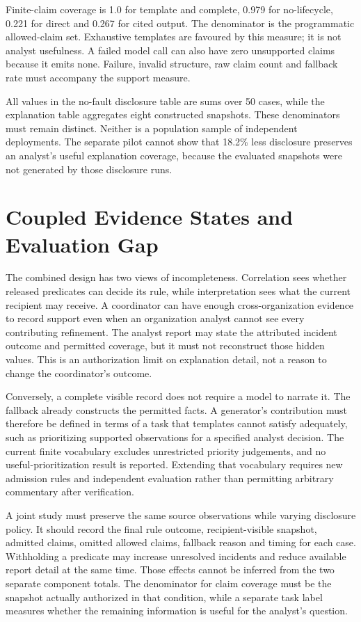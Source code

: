 \documentclass[conference,letterpaper]{IEEEtran}
\begin{document}
Finite-claim coverage is 1.0 for template and complete, 0.979 for no-lifecycle, 0.221 for direct and 0.267 for cited output. The denominator is the programmatic allowed-claim set. Exhaustive templates are favoured by this measure; it is not analyst usefulness. A failed model call can also have zero unsupported claims because it emits none. Failure, invalid structure, raw claim count and fallback rate must accompany the support measure.

All values in the no-fault disclosure table are sums over 50 cases, while the explanation table aggregates eight constructed snapshots. These denominators must remain distinct. Neither is a population sample of independent deployments. The separate pilot cannot show that 18.2\% less disclosure preserves an analyst's useful explanation coverage, because the evaluated snapshots were not generated by those disclosure runs.

\section{Coupled Evidence States and Evaluation Gap}
The combined design has two views of incompleteness. Correlation sees whether released predicates can decide its rule, while interpretation sees what the current recipient may receive. A coordinator can have enough cross-organization evidence to record support even when an organization analyst cannot see every contributing refinement. The analyst report may state the attributed incident outcome and permitted coverage, but it must not reconstruct those hidden values. This is an authorization limit on explanation detail, not a reason to change the coordinator's outcome.

Conversely, a complete visible record does not require a model to narrate it. The fallback already constructs the permitted facts. A generator's contribution must therefore be defined in terms of a task that templates cannot satisfy adequately, such as prioritizing supported observations for a specified analyst decision. The current finite vocabulary excludes unrestricted priority judgements, and no useful-prioritization result is reported. Extending that vocabulary requires new admission rules and independent evaluation rather than permitting arbitrary commentary after verification.

A joint study must preserve the same source observations while varying disclosure policy. It should record the final rule outcome, recipient-visible snapshot, admitted claims, omitted allowed claims, fallback reason and timing for each case. Withholding a predicate may increase unresolved incidents and reduce available report detail at the same time. Those effects cannot be inferred from the two separate component totals. The denominator for claim coverage must be the snapshot actually authorized in that condition, while a separate task label measures whether the remaining information is useful for the analyst's question.
\end{document}
